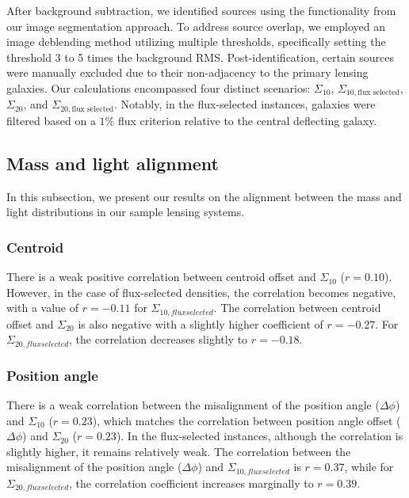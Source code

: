 \documentclass{aa}
\begin{document}
After background subtraction, we identified sources using the  functionality from our image segmentation approach. To address source overlap, we employed an image deblending method utilizing multiple thresholds, specifically setting the threshold 3 to 5 times the background RMS. Post-identification, certain sources were manually excluded due to their non-adjacency to the primary lensing galaxies. Our calculations encompassed four distinct scenarios: $\Sigma_{10}$, $\Sigma_{10,\text{flux selected}}$, $\Sigma_{20}$, and $\Sigma_{20,\text{flux selected}}$. Notably, in the flux-selected instances, galaxies were filtered based on a $1\%$ flux criterion relative to the central deflecting galaxy.

\subsection{Mass and light alignment}
In this subsection, we present our results on the alignment between the mass and light distributions in our sample lensing systems.
\subsubsection{Centroid}
There is a weak positive correlation between centroid offset and $\Sigma_{10}$ ($r=0.10$). However, in the case of flux-selected densities,  the correlation becomes negative, with a value of $r= - 0.11$ for $\Sigma_{10, flux selected}$. The correlation between centroid offset and $\Sigma_{20}$ is also negative with a slightly higher coefficient of $r = - 0.27$. For $\Sigma_{20, flux selected}$, the correlation decreases slightly to $r= - 0.18$.

\subsubsection{Position angle}
There is a weak correlation between the misalignment of the position angle ($\Delta \phi$) and $\Sigma_{10}$ ($r=0.23$), which matches the correlation between position angle offset ($\Delta \phi$) and $\Sigma_{20}$ ($r=0.23$). In the flux-selected instances, although the correlation is slightly higher, it remains relatively weak. The correlation between the misalignment of the position angle ($\Delta \phi$) and $\Sigma_{10, flux selected}$ is $r=0.37$, while for $ \Sigma_{20, flux selected}$, the correlation coefficient increases marginally to $r=0.39$.
\end{document}

